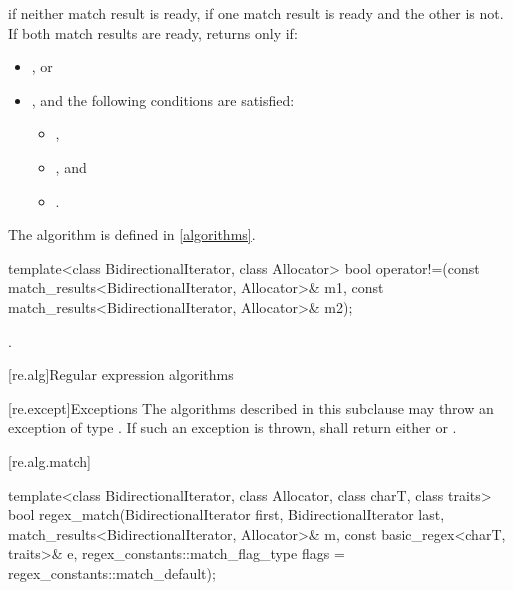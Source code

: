 \begin{itemdescr}
\pnum
\returns
{} if neither match result is ready,  if one match result is ready and the
other is not. If both match results are ready, returns  only if:

\begin{itemize}
\item
{}, or

\item
{}, and the following conditions are satisfied:

\begin{itemize}
\item
{},

\item
{}, and

\item
{}.
\end{itemize}
\end{itemize}
\begin{note} The algorithm  is defined in \ref{algorithms}. \end{note}
\end{itemdescr}

%
%
\begin{itemdecl}
template<class BidirectionalIterator, class Allocator>
bool operator!=(const match_results<BidirectionalIterator, Allocator>& m1,
                const match_results<BidirectionalIterator, Allocator>& m2);
\end{itemdecl}

\begin{itemdescr}
\pnum
\returns {}.
\end{itemdescr}

[re.alg]{Regular expression algorithms}

[re.except]{Exceptions}
\pnum
The algorithms described in this subclause may throw an exception
of type . If such an exception  is thrown,
 shall return either 
or .

[re.alg.match]{}
%
\begin{itemdecl}
template<class BidirectionalIterator, class Allocator, class charT, class traits>
  bool regex_match(BidirectionalIterator first, BidirectionalIterator last,
                   match_results<BidirectionalIterator, Allocator>& m,
                   const basic_regex<charT, traits>& e,
                   regex_constants::match_flag_type flags = regex_constants::match_default);
\end{itemdecl}


